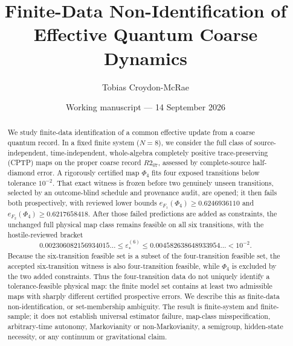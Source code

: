 \documentclass[11pt]{article}
\title{Finite-Data Non-Identification of Effective Quantum Coarse Dynamics}
\author{Tobias Croydon-McRae}
\date{Working manuscript --- 14 September 2026}
\newcommand{\eps}{\varepsilon}
\begin{document}
\maketitle

\begin{abstract}
We study finite-data identification of a common effective update from a coarse quantum record.  In a fixed finite system ($N=8$), we consider the full class of source-independent, time-independent, whole-algebra completely positive trace-preserving (CPTP) maps on the proper coarse record $R2_{07}$, assessed by complete-source half-diamond error.  A rigorously certified map $\Phi_4$ fits four exposed transitions below tolerance $10^{-2}$.  That exact witness is frozen before two genuinely unseen transitions, selected by an outcome-blind schedule and provenance audit, are opened; it then fails both prospectively, with reviewed lower bounds $e_{F_1}(\Phi_4)\ge0.6246936110$ and $e_{F_2}(\Phi_4)\ge0.6217658418$.  After those failed predictions are added as constraints, the unchanged full physical map class remains feasible on all six transitions, with the hostile-reviewed bracket
\[
0.002306082156934015\ldots\le \eps_*^{(6)}\le
0.004582638648933954\ldots < 10^{-2}.
\]
Because the six-transition feasible set is a subset of the four-transition feasible set, the accepted six-transition witness is also four-transition feasible, while $\Phi_4$ is excluded by the two added constraints.  Thus the four-transition data do not uniquely identify a tolerance-feasible physical map: the finite model set contains at least two admissible maps with sharply different certified prospective errors.  We describe this as finite-data non-identification, or set-membership ambiguity.  The result is finite-system and finite-sample; it does not establish universal estimator failure, map-class misspecification, arbitrary-time autonomy, Markovianity or non-Markovianity, a semigroup, hidden-state necessity, or any continuum or gravitational claim.
\end{abstract}










\appendix






\end{document}
